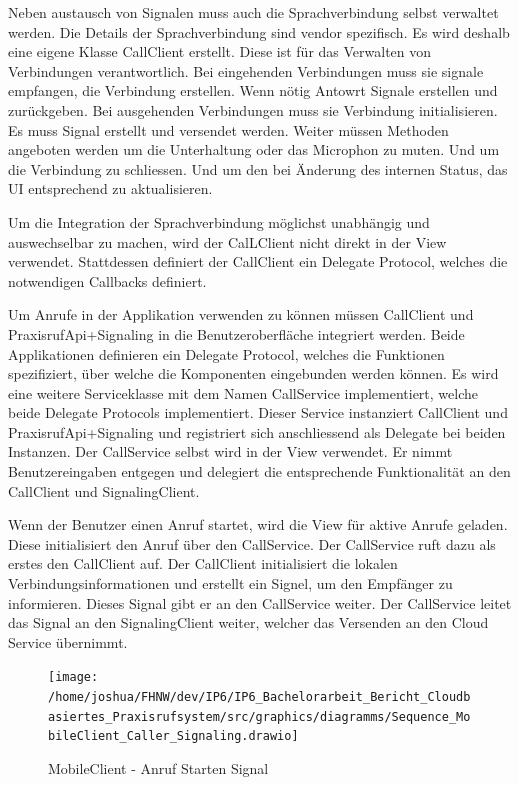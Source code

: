 Neben austausch von Signalen muss auch die Sprachverbindung selbst verwaltet werden.
Die Details der Sprachverbindung sind vendor spezifisch.
Es wird deshalb eine eigene Klasse CallClient erstellt.
Diese ist für das Verwalten von Verbindungen verantwortlich.
Bei eingehenden Verbindungen muss sie signale empfangen, die Verbindung erstellen.
Wenn nötig Antowrt Signale erstellen und zurückgeben.
Bei ausgehenden Verbindungen muss sie Verbindung initialisieren.
Es muss Signal erstellt und versendet werden.
Weiter müssen Methoden angeboten werden um die Unterhaltung oder das Microphon zu muten.
Und um die Verbindung zu schliessen.
Und um den bei Änderung des internen Status, das UI entsprechend zu aktualisieren.

Um die Integration der Sprachverbindung möglichst unabhängig und auswechselbar zu machen, wird der CalLClient nicht direkt in der View verwendet.
Stattdessen definiert der CallClient ein Delegate Protocol, welches die notwendigen Callbacks definiert.



Um Anrufe in der Applikation verwenden zu können müssen CallClient und PraxisrufApi+Signaling in die Benutzeroberfläche integriert werden.
Beide Applikationen definieren ein Delegate Protocol, welches die Funktionen spezifiziert, über welche die Komponenten eingebunden werden können.
Es wird eine weitere Serviceklasse mit dem Namen CallService implementiert, welche beide Delegate Protocols implementiert.
Dieser Service instanziert CallClient und PraxisrufApi+Signaling und registriert sich anschliessend als Delegate bei beiden Instanzen.
Der CallService selbst wird in der View verwendet.
Er nimmt Benutzereingaben entgegen und delegiert die entsprechende Funktionalität an den CallClient und SignalingClient.

Wenn der Benutzer einen Anruf startet, wird die View für aktive Anrufe geladen.
Diese initialisiert den Anruf über den CallService.
Der CallService ruft dazu als erstes den CallClient auf.
Der CallClient initialisiert die lokalen Verbindungsinformationen und erstellt ein Signel, um den Empfänger zu informieren.
Dieses Signal gibt er an den CallService weiter.
Der CallService leitet das Signal an den SignalingClient weiter, welcher das Versenden an den Cloud Service übernimmt.

\clearpage
\begin{figure}[h]
    \centering
    \begin{minipage}[b]{0.8\textwidth}
        \texttt{[image: /home/joshua/FHNW/dev/IP6/IP6\_Bachelorarbeit\_Bericht\_Cloudbasiertes\_Praxisrufsystem/src/graphics/diagramms/Sequence\_MobileClient\_Caller\_Signaling.drawio]}
        \caption{MobileClient - Anruf Starten Signal}
    \end{minipage}
\end{figure}

